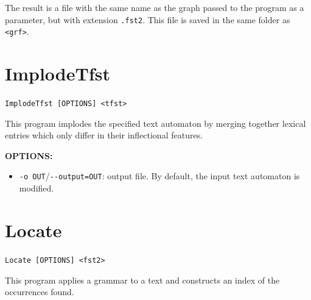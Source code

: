 \bigskip
\noindent The result is a file with the same name as the graph passed to the
program as a parameter, but with extension \verb+.fst2+. This file is saved in
the same folder as \verb+<grf>+.






\section{ImplodeTfst} \verb+ImplodeTfst [OPTIONS] <tfst>+

\bigskip
\noindent This program implodes the specified text automaton by merging
together lexical entries which only differ in their inflectional features.

\bigskip
\noindent \textbf{OPTIONS:}
\begin{itemize}
  \item \verb+-o OUT+/\verb+--output=OUT+: output file. By default, the input
  text automaton is modified.
\end{itemize}






\section{Locate}
\verb+Locate [OPTIONS] <fst2>+

\bigskip
\noindent {}
This program applies a grammar to a text and constructs an index of the
occurrences found.

